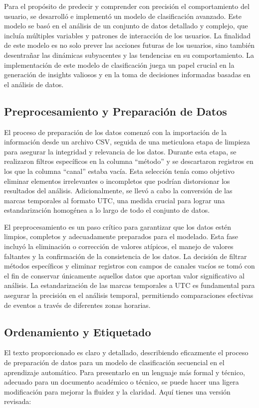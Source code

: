 Para el propósito de predecir y comprender con precisión el comportamiento del usuario, se desarrolló e implementó un modelo de clasificación avanzado. Este modelo se basó en el análisis de un conjunto de datos detallado y complejo, que incluía múltiples variables y patrones de interacción de los usuarios. La finalidad de este modelo es no solo prever las acciones futuras de los usuarios, sino también desentrañar las dinámicas subyacentes y las tendencias en su comportamiento. La implementación de este modelo de clasificación juega un papel crucial en la generación de insights valiosos y en la toma de decisiones informadas basadas en el análisis de datos.

\subsection{Preprocesamiento y Preparación de Datos}

El proceso de preparación de los datos comenzó con la importación de la información desde un archivo CSV, seguida de una meticulosa etapa de limpieza para asegurar la integridad y relevancia de los datos. Durante esta etapa, se realizaron filtros específicos en la columna “método” y se descartaron registros en los que la columna “canal” estaba vacía. Esta selección tenía como objetivo eliminar elementos irrelevantes o incompletos que podrían distorsionar los resultados del análisis. Adicionalmente, se llevó a cabo la conversión de las marcas temporales al formato UTC, una medida crucial para lograr una estandarización homogénea a lo largo de todo el conjunto de datos.

El preprocesamiento es un paso crítico para garantizar que los datos estén limpios, completos y adecuadamente preparados para el modelado. Esta fase incluyó la eliminación o corrección de valores atípicos, el manejo de valores faltantes y la confirmación de la consistencia de los datos. La decisión de filtrar métodos específicos y eliminar registros con campos de canales vacíos se tomó con el fin de conservar únicamente aquellos datos que aportan valor significativo al análisis. La estandarización de las marcas temporales a UTC es fundamental para asegurar la precisión en el análisis temporal, permitiendo comparaciones efectivas de eventos a través de diferentes zonas horarias.
\subsection{Ordenamiento y Etiquetado}
El texto proporcionado es claro y detallado, describiendo eficazmente el proceso de preparación de datos para un modelo de clasificación secuencial en el aprendizaje automático. Para presentarlo en un lenguaje más formal y técnico, adecuado para un documento académico o técnico, se puede hacer una ligera modificación para mejorar la fluidez y la claridad. Aquí tienes una versión revisada:

